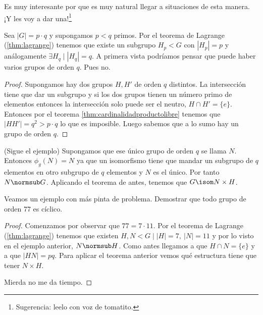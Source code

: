 Es muy interesante por que es muy natural llegar a situaciones de esta manera. ¡Y les voy a dar una!\footnote{Sugerencia: leelo con voz de tomatito.}

\begin{ej}
	Sea $|G| = p \cdot q$ y supongamos $p < q$ primos. Por el teorema de Lagrange (\ref{thm:lagrange}) tenemos que existe un subgrupo $H_p < G$ con $|H_p| = p$ y análogamente $\exists H_q \mid |H_q| = q$. A primera vista podríamos pensar que puede haber varios grupos de orden $q$. Pues no.
\end{ej}

\begin{proof}
	Supongamos hay dos grupos $H, H'$ de orden $q$ distintos. La intersección tiene que dar un subgrupo y si los dos grupos tienen un número primo de elementos entonces la intersección solo puede ser el neutro, $H \cap H' = \{e\}$. Entonces por el teorema \ref{thm:cardinalidadproductolibre} tenemos que $|HH'| = q^2 > p\cdot q$ lo que es imposible. Luego sabemos que a lo sumo hay un grupo de orden $q$.
\end{proof}

(Sigue el ejemplo) Supongamos que ese único grupo de orden $q$ se llama $N$. Entonces $\phi_g(N) = N$ ya que un isomorfismo tiene que mandar un subgrupo de $q$ elementos en otro subgrupo de $q$ elementos y $N$ es el único. Por tanto $N \normsub G$. Aplicando el teorema de antes, tenemos que $G \isom N \times H$.

\begin{ej}
	Veamos un ejemplo con más pinta de problema. Demostrar que todo grupo de orden $77$ es cíclico.
\end{ej}

\begin{proof}
	Comenzamos por observar que $77 = 7 \cdot 11$. Por el teorema de Lagrange (\ref{thm:lagrange}) tenemos que existen $H, N < G \mid |H| = 7,\ |N| = 11$ y por lo visto en el ejemplo anterior, $N \normsub H$. Como antes llegamos a que $H \cap N = \{e\}$ y a que $|H N| = pq$. Para aplicar el teorema anterior vemos qué estructura tiene que tener $N \times H$.
	
	Mierda no me da tiempo.
	
\end{proof}